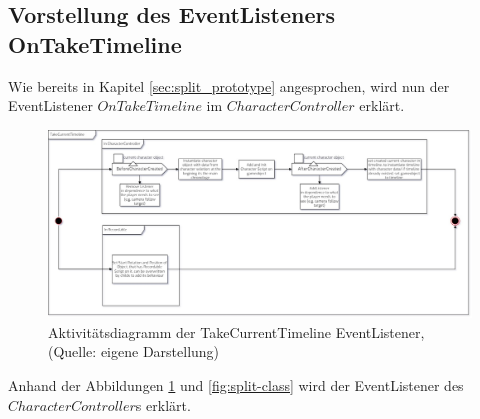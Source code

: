 \subsection{Vorstellung des EventListeners OnTakeTimeline}\label{sec:take_current_timeline_prototype}
Wie bereits in Kapitel \ref{sec:split_prototype} angesprochen, wird nun der EventListener $OnTakeTimeline$ im $CharacterController$ erklärt.

\begin{figure}[ht]
\centering
\includegraphics[width=1\linewidth]{content/pictures/OnTakeCurrentTimeline_uml.jpg}
\caption{Aktivitätsdiagramm der TakeCurrentTimeline EventListener, (Quelle: eigene Darstellung)}
\label{fig:take_current_timeline-uml}
\end{figure}

Anhand der Abbildungen \ref{fig:take_current_timeline-uml} und \ref{fig:split-class} wird der EventListener des \\$CharacterController$s erklärt.

